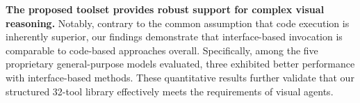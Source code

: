 \documentclass[runningheads]{llncs}
\begin{document}

\noindent \noindent \textbf{The proposed toolset provides robust support for complex visual reasoning.} 
Notably, contrary to the common assumption that code execution is inherently superior, our findings demonstrate that interface-based invocation is comparable to code-based approaches overall. 
Specifically, among the five proprietary general-purpose models evaluated, three exhibited better performance with interface-based methods. 
These quantitative results further validate that our structured 32-tool library effectively meets the requirements of visual agents. 
\end{document}
